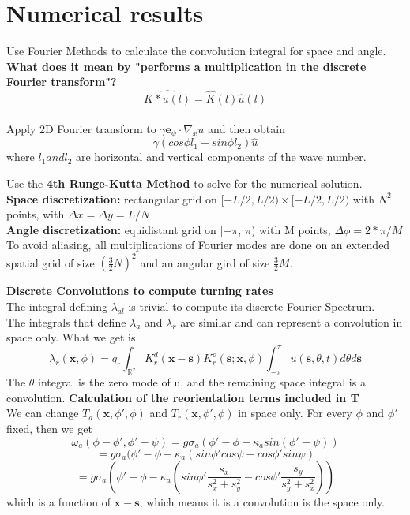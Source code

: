 \documentclass{article}
\begin{document}
\section{Numerical results}
Use Fourier Methods to calculate the convolution integral for space and angle. \\
{\color{blue} \textbf{What does it mean by "performs a multiplication in the discrete Fourier transform"?} $$\widehat{K*u(l)}=\hat{K}(l)\hat{u}(l)$$ }\\
Apply 2D Fourier transform to $\gamma \boldsymbol{e}_\phi \cdot \nabla_x u$ and then obtain $$\gamma(cos \phi l_1 + sin \phi l_2)\hat{u}$$ 
where $l_1 and l_2$ are horizontal and vertical components of the wave number.
\par
Use the \textbf{4th Runge-Kutta Method} to solve for the numerical solution.\\
\textbf{Space discretization:} rectangular grid on $[-L/2,L/2)\times [-L/2,L/2)$ with $N^2$ points, with $\Delta x=\Delta y=L/N$\\
\textbf{Angle discretization:} equidistant grid on [$-\pi$, $\pi$) with M points, $\Delta \phi = 2 *\pi / M$\\

To avoid aliasing, all multiplications of Fourier modes are done on an extended spatial grid of size $(\frac{3}{2} N)^2$ and an angular gird of size $\frac{3}{2} M$. 

\textbf{Discrete Convolutions to compute turning rates}\\
The integral defining $\lambda _ {al}$ is trivial to compute its discrete Fourier Spectrum. \\
The integrals that define $\lambda _ a$ and $\lambda _ r$ are similar and can represent a convolution in space only. What we get is 
$$\lambda_{r}(\boldsymbol{x},\phi)=
q_{r}\int_{\mathbb{R}^2}K^d_{r}(\boldsymbol{x}-\boldsymbol{s})K^{o}_{r}(\boldsymbol{s};\boldsymbol{x},\phi)\int^\pi_{-\pi} u(\boldsymbol{s},\theta,t)d\theta d\boldsymbol{s}$$
The $\theta$ integral is the zero mode of u, and the remaining space integral is a convolution. 
\textbf{Calculation of the reorientation terms included in T}\\
We can change $T_a(\boldsymbol{x}, \phi ', \phi)$ and $T_r(\boldsymbol{x}, \phi ', \phi)$ in space only. For every $\phi$ and $\phi '$ fixed, then we get 
$$\omega_{a}(\phi-\phi',\phi ' -\psi)=g \sigma_{a}(\phi ' - \phi - \kappa_{a}sin(\phi ' -\psi))$$
$$=g \sigma_{a}(\phi ' - \phi - \kappa_{a}(sin\phi 'cos\psi-cos\phi ' sin\psi)$$
$$=g \sigma_{a}(\phi ' - \phi - \kappa_{a}(sin\phi '\frac{s_{x}}{s_{x}^{2}+s_{y}^{2}}-cos\phi ' \frac{s_{y}}{s_{y}^{2}+s_{x}^{2}}))$$
which is a function of $\boldsymbol{x}-\boldsymbol{s}$, which means it is a convolution is the space only. 
\end{document}

